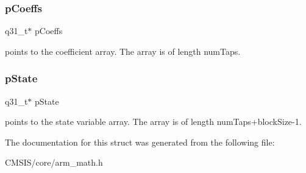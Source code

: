 \subsubsection{\texorpdfstring{p\+Coeffs}{pCoeffs}}
{\footnotesize\ttfamily q31\+\_\+t$\ast$ p\+Coeffs}

points to the coefficient array. The array is of length num\+Taps. \mbox{\label{structarm__fir__instance__q31_adee4ba3ee8869865af7d8fa08ca913d6}} 
\subsubsection{\texorpdfstring{p\+State}{pState}}
{\footnotesize\ttfamily q31\+\_\+t$\ast$ p\+State}

points to the state variable array. The array is of length num\+Taps+block\+Size-\/1. 

The documentation for this struct was generated from the following file\+:\begin{DoxyCompactItemize}
\item 
C\+M\+S\+I\+S/core/arm\+\_\+math.\+h\end{DoxyCompactItemize}
